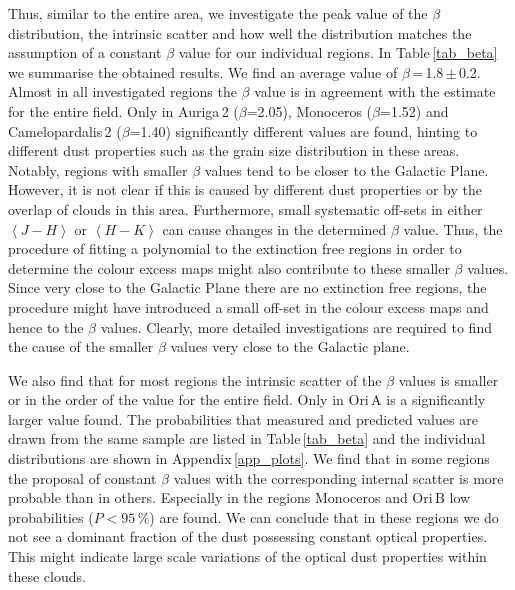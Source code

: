 \documentclass[useAMS,usenatbib]{mn2e}
\begin{document}
Thus, similar to the entire area, we investigate the peak value of the $\beta$
distribution, the intrinsic scatter and how well the distribution matches the
assumption of a constant $\beta$ value for our individual regions. In
Table\,\ref{tab_beta} we summarise the obtained results. We find an average
value of $\beta$\,=\,1.8\,$\pm$\,0.2. Almost in all investigated regions the
$\beta$ value is in agreement with the estimate for the entire field. Only in
Auriga\,2 ($\beta$=2.05), Monoceros ($\beta$=1.52) and Camelopardalis\,2
($\beta$=1.40) significantly different values are found, hinting to different
dust properties such as the grain size distribution in these areas. Notably,
regions with smaller $\beta$ values tend to be closer to the Galactic Plane.
However, it is not clear if this is caused by different dust properties or by
the overlap of clouds in this area. Furthermore, small systematic off-sets
in either $\left< J-H \right>$ or $\left< H-K \right>$ can cause changes in the
determined $\beta$ value. Thus, the procedure of fitting a polynomial to the
extinction free regions in order to determine the colour excess maps might also
contribute to these smaller $\beta$ values. Since very close to the Galactic
Plane there are no extinction free regions, the procedure might have introduced
a small off-set in the colour excess maps and hence to the $\beta$ values.
Clearly, more detailed investigations are required to find the cause of the
smaller $\beta$ values very close to the Galactic plane. 

We also find that for most regions the intrinsic scatter of the $\beta$ values
is smaller or in the order of the value for the entire field. Only in Ori\,A is
a significantly larger value found. The probabilities that measured and
predicted values are drawn from the same sample are listed in
Table\,\ref{tab_beta} and the individual distributions are shown in
Appendix\,\ref{app_plots}. We find that in some regions the proposal of constant
$\beta$ values with the corresponding internal scatter is more probable than in
others. Especially in the regions Monoceros and Ori\,B low probabilities
($P<95\,\%$) are found. We can conclude that in these regions we do not see a
dominant fraction of the dust possessing constant optical properties. This might
indicate large scale variations of the optical dust properties within these
clouds.
\end{document}
